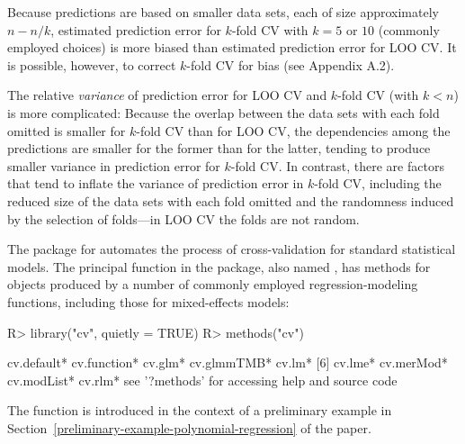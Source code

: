 \documentclass[
]{jss}
\begin{document}
Because predictions are based on smaller data sets, each of size
approximately \(n - n/k\), estimated prediction error for \(k\)-fold CV
with \(k = 5\) or \(10\) (commonly employed choices) is more biased than
estimated prediction error for LOO CV. It is possible, however, to
correct \(k\)-fold CV for bias (see Appendix A.2).

The relative \emph{variance} of prediction error for LOO CV and
\(k\)-fold CV (with \(k < n\)) is more complicated: Because the overlap
between the data sets with each fold omitted is smaller for \(k\)-fold
CV than for LOO CV, the dependencies among the predictions are smaller
for the former than for the latter, tending to produce smaller variance
in prediction error for \(k\)-fold CV. In contrast, there are factors
that tend to inflate the variance of prediction error in \(k\)-fold CV,
including the reduced size of the data sets with each fold omitted and
the randomness induced by the selection of folds---in LOO CV the folds
are not random.

The  package for  automates the process of
cross-validation for standard  statistical models. The
principal function in the package, also named , has methods
for objects produced by a number of commonly employed
regression-modeling functions, including those for mixed-effects models:

\begin{CodeChunk}
\begin{CodeInput}
R> library("cv", quietly = TRUE)
R> methods("cv")
\end{CodeInput}
\begin{CodeOutput}
[1] cv.default*  cv.function* cv.glm*      cv.glmmTMB*  cv.lm*
[6] cv.lme*      cv.merMod*   cv.modList*  cv.rlm*
see '?methods' for accessing help and source code
\end{CodeOutput}
\end{CodeChunk}

The  function is introduced in the context of a preliminary
example in Section~\ref{preliminary-example-polynomial-regression} of
the paper.
\end{document}
